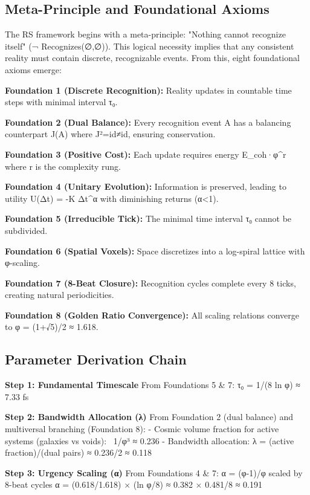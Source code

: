 \documentclass[twocolumn,prd,amsmath,amssymb,aps,superscriptaddress,nofootinbib]{revtex4-2}
\begin{document}
\subsection{Meta-Principle and Foundational Axioms}

The RS framework begins with a meta-principle: "Nothing cannot recognize itself" (¬ Recognizes(∅,∅)). This logical necessity implies that any consistent reality must contain discrete, recognizable events. From this, eight foundational axioms emerge:

\textbf{Foundation 1 (Discrete Recognition):} Reality updates in countable time steps with minimal interval τ₀.

\textbf{Foundation 2 (Dual Balance):} Every recognition event A has a balancing counterpart J(A) where J²=id≠id, ensuring conservation.

\textbf{Foundation 3 (Positive Cost):} Each update requires energy E_coh·φ^r where r is the complexity rung.

\textbf{Foundation 4 (Unitary Evolution):} Information is preserved, leading to utility U(Δt) = -K Δt^α with diminishing returns (α<1).

\textbf{Foundation 5 (Irreducible Tick):} The minimal time interval τ₀ cannot be subdivided.

\textbf{Foundation 6 (Spatial Voxels):} Space discretizes into a log-spiral lattice with φ-scaling.

\textbf{Foundation 7 (8-Beat Closure):} Recognition cycles complete every 8 ticks, creating natural periodicities.

\textbf{Foundation 8 (Golden Ratio Convergence):} All scaling relations converge to φ = (1+√5)/2 ≈ 1.618.

\subsection{Parameter Derivation Chain}

\textbf{Step 1: Fundamental Timescale}
From Foundations 5 & 7: τ₀ = 1/(8 ln φ) ≈ 7.33 fs

\textbf{Step 2: Bandwidth Allocation (λ)}
From Foundation 2 (dual balance) and multiversal branching (Foundation 8):
- Cosmic volume fraction for active systems (galaxies vs voids): ~1/φ³ ≈ 0.236
- Bandwidth allocation: λ = (active fraction)/(dual pairs) ≈ 0.236/2 ≈ 0.118

\textbf{Step 3: Urgency Scaling (α)}
From Foundations 4 & 7: α = (φ-1)/φ scaled by 8-beat cycles
α = (0.618/1.618) × (ln φ/8) ≈ 0.382 × 0.481/8 ≈ 0.191
\end{document}
